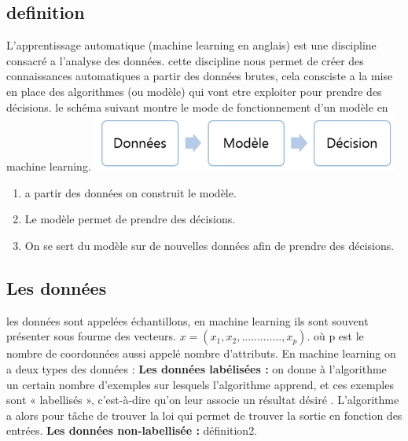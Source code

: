 \documentclass[a4paper,11pt]{report}
\begin{document}
\subsection*{definition}
L'apprentissage automatique (machine learning en anglais) est une discipline consacré a l'analyse des données. cette discipline nous permet de créer des connaissances automatiques a partir des données brutes, cela consciste a la mise en place des algorithmes (ou modèle) qui vont etre exploiter pour prendre des décisions.\newline
le schéma suivant montre le mode de fonctionnement d'un modèle en machine learning.\newline
\hspace*{4cm}\includegraphics[scale=1]{m_learning.png} 
 \begin{enumerate}
 \item a partir des données on construit le modèle.
 \item Le modèle permet de prendre des décisions.
 \item On se sert du modèle sur de nouvelles données afin de prendre des décisions.
 \end{enumerate}
\subsection{Les données}
les données sont appelées échantillons, en machine learning ils sont souvent présenter sous fourme des vecteurs.\newline
$x=(x_1, x_2,.............,x_p).$\newline
où p est le nombre de coordonnées aussi appelé nombre d’attributs.\newline
En machine learning on a deux types des données :\newline
\newline
\textbf{Les données labélisées :} on donne à l’algorithme un certain nombre d’exemples sur lesquels l'algorithme  apprend, et ces exemples sont « labellisés », c’est-à-dire qu’on leur associe un résultat désiré . L’algorithme a alors pour tâche de trouver la loi qui permet de trouver la sortie en fonction des entrées.\newline
\newline 
\textbf{Les données non-labellisée :} définition2.
\end{document}

